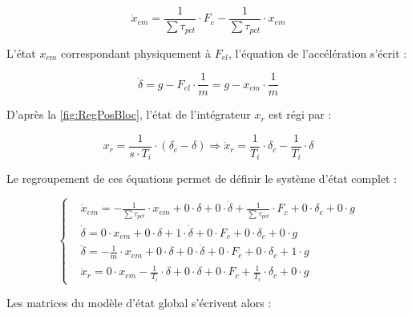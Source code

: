 \begin{equation}
    \dot{x}_{em} = \frac{1}{\sum\tau_{pct}} \cdot F_c - \frac{1}{\sum\tau_{pct}} \cdot x_{em}
\end{equation}

L'état $x_{em}$ correspondant physiquement à $F_{el}$, l'équation de l'accélération s'écrit :

\begin{equation}
    \ddot{\delta} = g - F_{el} \cdot \frac{1}{m} = g - x_{em} \cdot \frac{1}{m}
\end{equation}

D'après la \autoref{fig:RegPosBloc}, l'état de l'intégrateur $x_r$ est régi par :

\begin{equation}
    x_r = \frac{1}{s \cdot T_i} \cdot (\delta_c - \delta) \Rightarrow \dot{x}_r = \frac{1}{T_i} \cdot \delta_c - \frac{1}{T_i} \cdot \delta
\end{equation}

Le regroupement de ces équations permet de définir le système d'état complet :

\begin{equation}
    \left\{
    \begin{aligned}
         & \dot{x}_{em} = -\frac{1}{\sum\tau_{pct}} \cdot x_{em} + 0 \cdot \delta + 0 \cdot \dot{\delta} + \frac{1}{\sum\tau_{pct}} \cdot F_c + 0 \cdot \delta_c + 0 \cdot g
        \\
         & \dot{\delta} = 0 \cdot x_{em} + 0 \cdot \delta + 1 \cdot \dot{\delta} + 0 \cdot F_c + 0 \cdot \delta_c + 0 \cdot g
        \\
         & \ddot{\delta} = -\frac{1}{m} \cdot x_{em} + 0 \cdot \delta + 0 \cdot \dot{\delta} + 0 \cdot F_c + 0 \cdot \delta_c + 1 \cdot g
        \\
         & \dot{x}_r = 0 \cdot x_{em} - \frac{1}{T_i} \cdot \delta + 0 \cdot \dot{\delta} + 0 \cdot F_c + \frac{1}{T_i} \cdot \delta_c + 0 \cdot g
    \end{aligned}
    \right.
\end{equation}

Les matrices du modèle d'état global s'écrivent alors :

